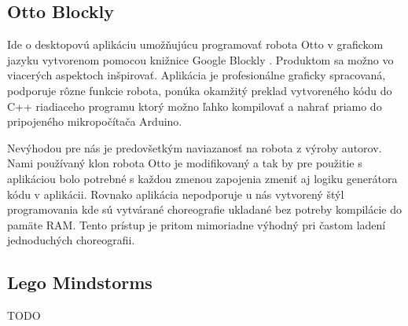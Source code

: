 \subsection{Otto Blockly}
Ide o desktopovú aplikáciu umožňujúcu programovať robota Otto v grafickom jazyku vytvorenom pomocou knižnice Google Blockly \cite{OttoBlockly}. Produktom sa možno vo viacerých aspektoch inšpirovať. Aplikácia je profesionálne graficky spracovaná, podporuje rôzne funkcie robota, ponúka okamžitý preklad vytvoreného kódu do C++ riadiaceho programu ktorý možno ľahko kompilovať a nahrať priamo do pripojeného mikropočítača Arduino.

Nevýhodou pre nás je predovšetkým naviazanosť na robota z výroby autorov. Nami používaný klon robota Otto je modifikovaný a tak by pre použitie s aplikáciou bolo potrebné s každou zmenou zapojenia zmeniť aj logiku generátora kódu v aplikácii. Rovnako aplikácia nepodporuje u nás vytvorený štýl programovania kde sú vytvárané choreografie ukladané bez potreby kompilácie do pamäte RAM. Tento prístup je pritom mimoriadne výhodný pri častom ladení jednoduchých choreografii. 

\subsection{Lego Mindstorms}
TODO
